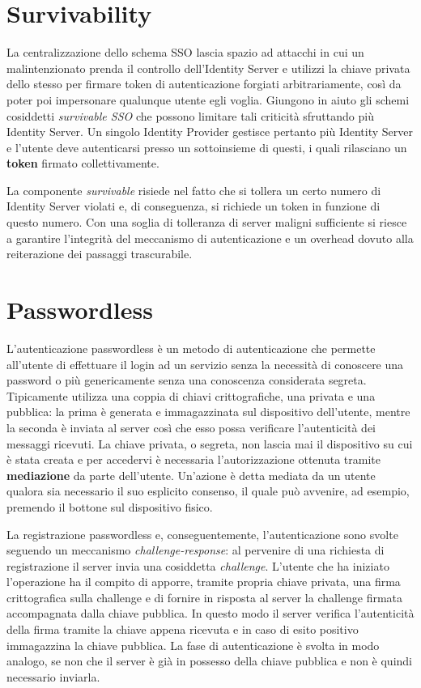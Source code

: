 \section{Survivability}
\label{surviv}

La centralizzazione dello schema SSO lascia spazio ad attacchi in cui un malintenzionato prenda il controllo dell'Identity Server e utilizzi la chiave privata dello stesso per firmare token di autenticazione forgiati arbitrariamente, così da poter poi impersonare qualunque utente egli voglia. Giungono in aiuto gli schemi cosiddetti \emph{survivable SSO} che possono limitare tali criticità sfruttando più Identity Server. Un singolo Identity Provider gestisce pertanto più Identity Server e l'utente deve autenticarsi presso un sottoinsieme di questi, i quali rilasciano un \textbf{token} firmato collettivamente. 

La componente \emph{survivable} risiede nel fatto che si tollera un certo numero di Identity Server violati e, di conseguenza, si richiede un token in funzione di questo numero. Con una soglia di tolleranza di server maligni sufficiente si riesce a garantire l'integrità del meccanismo di autenticazione e un overhead dovuto alla reiterazione dei passaggi trascurabile.

\section{Passwordless}
\label{passwordless}

L'autenticazione passwordless è un metodo di autenticazione che permette all'utente di effettuare il login ad un servizio senza la necessità di conoscere una password o più genericamente senza una conoscenza considerata segreta. Tipicamente utilizza una coppia di chiavi crittografiche, una privata e una pubblica: la prima è generata e immagazzinata sul dispositivo dell'utente, mentre la seconda è inviata al server così che esso possa verificare l'autenticità dei messaggi ricevuti. La chiave privata, o segreta, non lascia mai il dispositivo su cui è stata creata e per accedervi è necessaria l'autorizzazione ottenuta tramite \textbf{mediazione} da parte dell'utente. Un'azione è detta mediata da un utente qualora sia necessario il suo esplicito consenso, il quale può avvenire, ad esempio, premendo il bottone sul dispositivo fisico.

La registrazione passwordless e, conseguentemente, l'autenticazione sono svolte seguendo un meccanismo \emph{challenge-response}: al pervenire di una richiesta di registrazione il server invia una cosiddetta \emph{challenge}. L'utente che ha iniziato l'operazione ha il compito di apporre, tramite propria chiave privata, una firma crittografica sulla challenge e di fornire in risposta al server la challenge firmata accompagnata dalla chiave pubblica. In questo modo il server verifica l'autenticità della firma tramite la chiave appena ricevuta e in caso di esito positivo immagazzina la chiave pubblica. La fase di autenticazione è svolta in modo analogo, se non che il server è già in possesso della chiave pubblica e non è quindi necessario inviarla.


